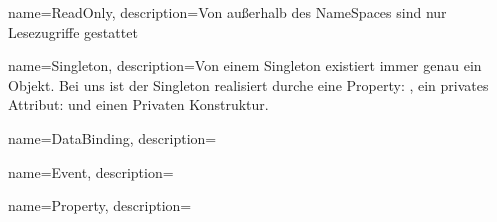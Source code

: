 {
	name=ReadOnly,
	description={Von außerhalb des NameSpaces sind nur Lesezugriffe gestattet}
}

{
	name=Singleton,
	description={Von einem Singleton existiert immer genau ein Objekt.
					Bei uns ist der Singleton realisiert durche eine Property: ,
					ein privates Attribut:  und einen Privaten Konstruktur.}
}

{
	name=DataBinding,
	description={}
}

{
	name=Event,
	description={}
}

{
	name=Property,
	description={}
}
